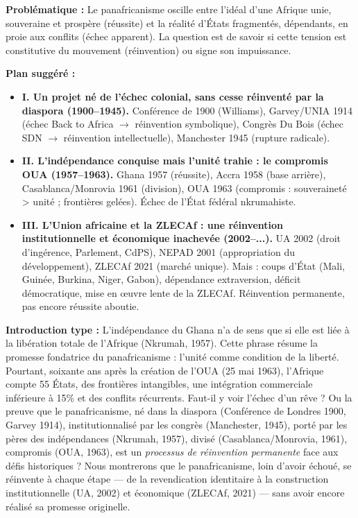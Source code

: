 \documentclass[11pt]{article}
\begin{document}
\begin{corrige}
\textbf{Problématique :} Le panafricanisme oscille entre l'idéal d'une Afrique unie, souveraine et prospère (réussite) et la réalité d'États fragmentés, dépendants, en proie aux conflits (échec apparent). La question est de savoir si cette tension est constitutive du mouvement (réinvention) ou signe son impuissance.

\textbf{Plan suggéré :}
\begin{itemize}
    \item \textbf{I. Un projet né de l'échec colonial, sans cesse réinventé par la diaspora (1900–1945).} Conférence de 1900 (Williams), Garvey/UNIA 1914 (échec Back to Africa $\rightarrow$ réinvention symbolique), Congrès Du Bois (échec SDN $\rightarrow$ réinvention intellectuelle), Manchester 1945 (rupture radicale).
    \item \textbf{II. L'indépendance conquise mais l'unité trahie : le compromis OUA (1957–1963).} Ghana 1957 (réussite), Accra 1958 (base arrière), Casablanca/Monrovia 1961 (division), OUA 1963 (compromis : souveraineté > unité ; frontières gelées). Échec de l'État fédéral nkrumahiste.
    \item \textbf{III. L'Union africaine et la ZLECAf : une réinvention institutionnelle et économique inachevée (2002–...).} UA 2002 (droit d'ingérence, Parlement, CdPS), NEPAD 2001 (appropriation du développement), ZLECAf 2021 (marché unique). Mais : coups d'État (Mali, Guinée, Burkina, Niger, Gabon), dépendance extraversion, déficit démocratique, mise en œuvre lente de la ZLECAf. Réinvention permanente, pas encore réussite aboutie.
\end{itemize}

\textbf{Introduction type :} \og L'indépendance du Ghana n'a de sens que si elle est liée à la libération totale de l'Afrique \fg (Nkrumah, 1957). Cette phrase résume la promesse fondatrice du panafricanisme : l'unité comme condition de la liberté. Pourtant, soixante ans après la création de l'OUA (25 mai 1963), l'Afrique compte 55 États, des frontières intangibles, une intégration commerciale inférieure à 15\% et des conflits récurrents. Faut-il y voir l'échec d'un rêve ? Ou la preuve que le panafricanisme, né dans la diaspora (Conférence de Londres 1900, Garvey 1914), institutionnalisé par les congrès (Manchester, 1945), porté par les pères des indépendances (Nkrumah, 1957), divisé (Casablanca/Monrovia, 1961), compromis (OUA, 1963), est un \emph{processus de réinvention permanente} face aux défis historiques ? Nous montrerons que le panafricanisme, loin d'avoir échoué, se réinvente à chaque étape — de la revendication identitaire à la construction institutionnelle (UA, 2002) et économique (ZLECAf, 2021) — sans avoir encore réalisé sa promesse originelle.
\end{corrige}
\end{document}
